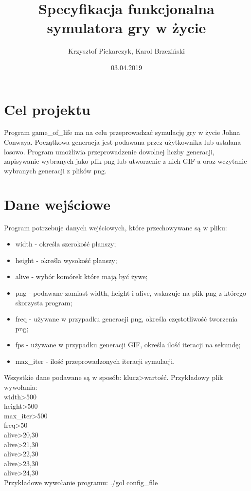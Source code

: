\documentclass[12pt]{article}
\title{Specyfikacja funkcjonalna symulatora gry w życie}
\author{Krzysztof Piekarczyk, Karol Brzeziński}
\date{03.04.2019}
\begin{document}
\maketitle


\section{Cel projektu}

Program game\_of\_life ma na celu przeprowadzać symulację gry w życie Johna Conwaya. Początkowa generacja jest podawana przez użytkownika lub ustalana losowo. Program umożliwia przeprowadzenie dowolnej liczby generacji, zapisywanie wybranych jako plik png lub utworzenie z nich GIF-a oraz wczytanie wybranych generacji z plików png.


\section{Dane wejściowe}

Program potrzebuje danych wejściowych, które przechowywane są w pliku:
\begin{itemize}
	\item width - określa szerokość planszy;
	\item height - określa wysokość planszy;
	\item alive - wybór komórek które mają być żywe;
	\item png - podawane zamiast width, height i alive, wskazuje na plik png z którego skorzysta program;
	\item freq - używane w przypadku generacji png, określa częstotliwość tworzenia png;
	\item fps - używane w przypadku generacji GIF, określa ilość iteracji na sekundę;
	\item max\_iter - ilość przeprowadzonych iteracji symulacji.
\end{itemize}

Wszystkie dane podawane są w sposób: klucz\textgreater{}wartość.
Przykładowy plik wywołania:\\
width\textgreater{}500\\
height\textgreater{}500\\
max\_iter\textgreater{}500\\
freq\textgreater{}50\\
alive\textgreater{}20,30\\
alive\textgreater{}21,30\\
alive\textgreater{}22,30\\
alive\textgreater{}23,30\\
alive\textgreater{}24,30\\
Przykładowe wywołanie programu:	./gol config\_file
\end{document}
